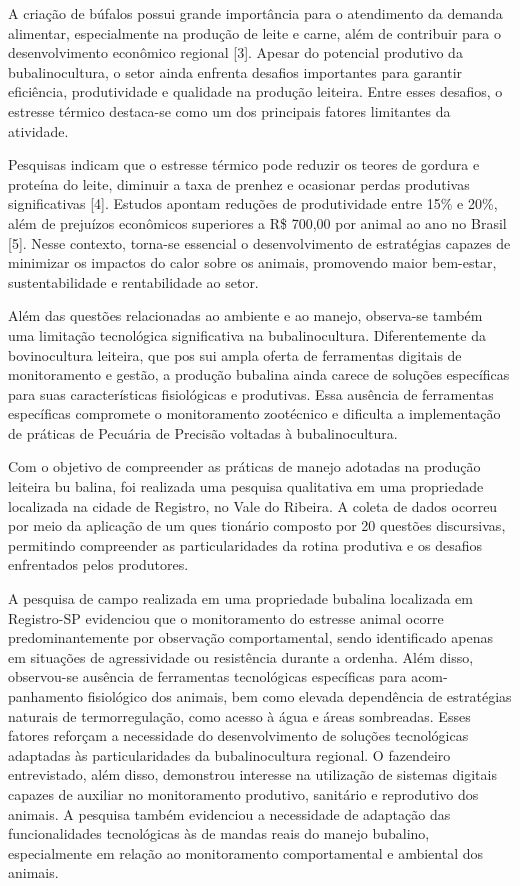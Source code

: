 \documentclass[11pt,a4paper]{article}
\begin{document}
A criação de búfalos possui grande importância para o atendimento da demanda alimentar, especialmente na produção de leite e carne, além de contribuir para o desenvolvimento econômico regional [3]. Apesar do potencial produtivo da bubalinocultura, o setor ainda enfrenta desafios importantes para garantir eficiência, produtividade e qualidade na produção leiteira. Entre esses desafios, o estresse térmico destaca-se como um dos principais fatores limitantes da atividade.

Pesquisas indicam que o estresse térmico pode reduzir os teores de gordura e proteína do leite, diminuir a taxa de prenhez e ocasionar perdas produtivas significativas [4]. Estudos apontam reduções de produtividade entre 15\% e 20\%, além de prejuízos econômicos superiores a R\$ 700,00 por animal ao ano no Brasil [5]. Nesse contexto, torna-se essencial o desenvolvimento de estratégias capazes de minimizar os impactos do calor sobre os animais, promovendo maior bem-estar, sustentabilidade e rentabilidade ao setor.

Além das questões relacionadas ao ambiente e ao manejo, observa-se também uma limitação
tecnológica significativa na bubalinocultura. Diferentemente da bovinocultura leiteira, que pos
sui ampla oferta de ferramentas digitais de monitoramento e gestão, a produção bubalina ainda
carece de soluções específicas para suas características fisiológicas e produtivas. Essa ausência
de ferramentas específicas compromete o monitoramento zootécnico e dificulta a implementação
de práticas de Pecuária de Precisão voltadas à bubalinocultura.   

Com o objetivo de compreender as práticas de manejo adotadas na produção leiteira bu
balina, foi realizada uma pesquisa qualitativa em uma propriedade localizada na cidade de
Registro, no Vale do Ribeira. A coleta de dados ocorreu por meio da aplicação de um ques
tionário composto por 20 questões discursivas, permitindo compreender as particularidades da
rotina produtiva e os desafios enfrentados pelos produtores.

A pesquisa de campo realizada em uma propriedade bubalina localizada em Registro-SP
evidenciou que o monitoramento do estresse animal ocorre predominantemente por observação
comportamental, sendo identificado apenas em situações de agressividade ou resistência durante
a ordenha. Além disso, observou-se ausência de ferramentas tecnológicas específicas para acom-
panhamento fisiológico dos animais, bem como elevada dependência de estratégias naturais de
termorregulação, como acesso à água e áreas sombreadas. Esses fatores reforçam a necessidade
do desenvolvimento de soluções tecnológicas adaptadas às particularidades da bubalinocultura
regional. O fazendeiro entrevistado, além disso, demonstrou interesse na utilização de sistemas
digitais capazes de auxiliar no monitoramento produtivo, sanitário e reprodutivo dos animais. A
pesquisa também evidenciou a necessidade de adaptação das funcionalidades tecnológicas às de
mandas reais do manejo bubalino, especialmente em relação ao monitoramento comportamental
e ambiental dos animais.
\end{document}
